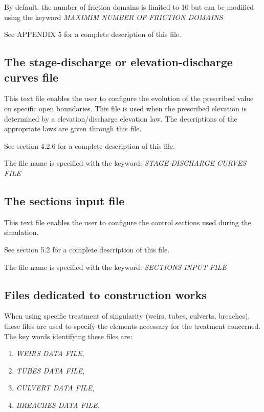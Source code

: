  By default, the number of friction domains is limited to 10 but can be modified using the keyword \textit{MAXIMIM NUMBER OF FRICTION DOMAINS}

 See APPENDIX 5  for a complete description of this file.


\subsection{ The stage-discharge or elevation-discharge curves file}

 This text file enables the user to configure the evolution of the prescribed value on specific open boundaries. This file is used when the prescribed elevation is determined by a elevation/discharge elevation law. The descriptions of the appropriate laws are given through this file.

 See section 4.2.6 for a complete description of this file.

 The file name is specified with the keyword: \textit{STAGE-DISCHARGE CURVES FILE}


\subsection{ The sections input file}

 This text file enables the user to configure the control sections used during the simulation.

 See section 5.2 for a complete description of this file.

 The file name is specified with the keyword: \textit{SECTIONS INPUT FILE}


\subsection{ Files dedicated to construction works}

 When using specific treatment of singularity (weirs, tubes, culverts, breaches), these files are used to specify the elements necessary for the treatment concerned. The key words identifying these files are:

\begin{enumerate}
\item  \textit{WEIRS DATA FILE},

\item  \textit{TUBES DATA FILE},

\item  \textit{CULVERT DATA FILE},

\item  \textit{BREACHES DATA FILE}.
\end{enumerate}


